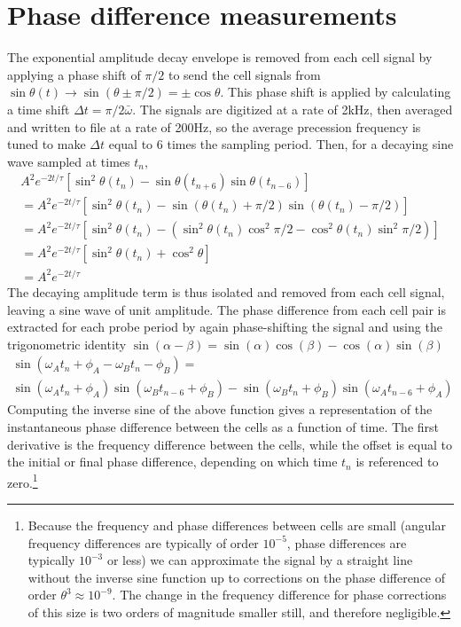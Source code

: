 \documentclass [10pt, twoside] {uwthesis}[2012/04/02]
\begin{document}
\section{Phase difference measurements}
The exponential amplitude decay envelope is removed from each cell signal by applying a phase shift of $\pi/2$ to send the cell signals from $\sin\theta(t) \rightarrow \sin(\theta\pm \pi/2) = \pm \cos\theta$. This phase shift is applied by calculating a time shift $\Delta t = \pi/2\bar{\omega}$. The signals are digitized at a rate of 2kHz, then averaged and written to file at a rate of 200Hz, so the average precession frequency is tuned to make $\Delta t$ equal to 6 times the sampling period. Then, for a decaying sine wave sampled at times $t_n$, 
\begin{align}
 A^2e^{-2t/\tau} [\sin^2\theta(t_n)-\sin\theta(t_{n+6}) \sin\theta(t_{n-6})] \\ 
=A^2e^{-2t/\tau} [\sin^2\theta(t_n)-\sin(\theta(t_n) + \pi/2) \sin(\theta(t_n) - \pi/2)] \\
=A^2e^{-2t/\tau} [\sin^2\theta(t_n)-(\sin^2\theta(t_n) \cos^2\pi/2 - \cos^2\theta(t_n) \sin^2\pi/2)]\\
=A^2e^{-2t/\tau} [\sin^2\theta(t_n) + \cos^2\theta] \\
=A^2e^{-2t/\tau}
\end{align}
The decaying amplitude term is thus isolated and removed from each cell signal, leaving a sine wave of unit amplitude. The phase difference from each cell pair is extracted for each probe period by again phase-shifting the signal and using the trigonometric identity $\sin(\alpha-\beta) = \sin(\alpha)\cos(\beta)-\cos(\alpha)\sin(\beta)$
\begin{multline}
\sin(\omega_A t_n + \phi_A -\omega_B t_n - \phi_B) = \\ 
  \sin(\omega_A t_n + \phi_A) \sin(\omega_B t_{n-6} + \phi_B) 
- \sin(\omega_B t_n + \phi_B) \sin(\omega_A t_{n-6} + \phi_A)
\end{multline}
Computing the inverse sine of the above function gives a representation of the instantaneous phase difference between the cells as a function of time. The first derivative is the frequency difference between the cells, while the offset is equal to the initial or final phase difference, depending on which time $t_n$ is referenced to zero.\footnote{Because the frequency and phase differences between cells are small (angular frequency differences are typically of order $10^{-5}$, phase differences are typically $10^{-3}$ or less) we can approximate the signal by a straight line without the inverse sine function up to corrections on the phase difference of order $\theta^3\approx 10^{-9}.$ The change in the frequency difference for phase corrections of this size is two orders of magnitude smaller still, and therefore negligible.}
\end{document}
